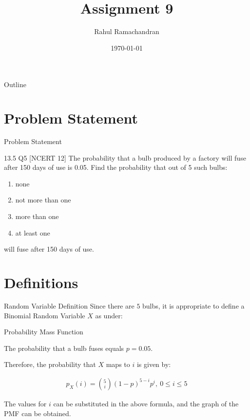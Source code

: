 \documentclass{beamer}
\title{Assignment 9}
\author{Rahul Ramachandran}
\date{\today}
\begin{document}
\begin{frame}
    \titlepage 
\end{frame}

\logo{}


\begin{frame}{Outline}
    \tableofcontents
\end{frame}



\section{Problem Statement}
\begin{frame}{Problem Statement}
    \begin{block}{13.5 Q5 [NCERT 12] } The probability that a bulb produced by a factory will fuse after 150 days of use is 0.05. Find the probability that out of 5 such bulbs:
    \begin{enumerate}[label=(\roman*)]
	\item none
	\item not more than one
	\item more than one
	\item at least one
	\end{enumerate}
	will fuse after 150 days of use.
    \end{block}
\end{frame}

\section{Definitions}
\begin{frame}{Random Variable Definition}
Since there are $5$ bulbs, it is appropriate to define a Binomial Random Variable $X$ as under:


\begin{table}[ht!]
    \centering
    
    \caption{Random Variable $X$}
	\label{table:table1}
\end{table}

\end{frame}

\begin{frame}{Probability Mass Function}

The probability that a bulb fuses equals $p=0.05$.

Therefore, the probability that $X$ maps to $i$ is given by:
\begin{block}{}
       \begin{align}
                \label{eq1}
           p_X{(i)} = \binom{5}{i} (1-p)^{5-i} p^i ,~ 0 \le i \le 5 
       \end{align}
\end{block}

The values for $i$ can be substituted in the above formula, and the graph of the PMF can be obtained.
\end{frame}
\end{document}
